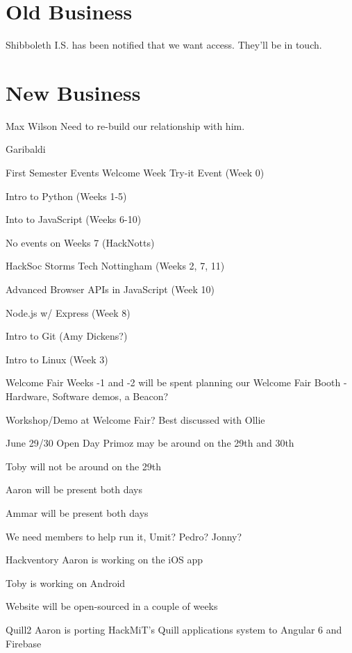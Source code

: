 \documentclass[11pt,hacksoc]{meetingmins}
\begin{document}
\section{Old Business}
\begin{items}
	\item
	Shibboleth
		\subitem
		I.S. has been notified that we want access. They'll be in touch.
\end{items}

\section{New Business}
\begin{items}
	\item
	Max Wilson
		\subitem
		Need to re-build our relationship with him.
	
	\item
	Garibaldi
	
	\item
	First Semester Events
		\subitem
		Welcome Week Try-it Event (Week 0)
		
		\subitem
		Intro to Python (Weeks 1-5)
		
		\subitem
		Into to JavaScript (Weeks 6-10)
		
		\subitem
		No events on Weeks 7 (HackNotts)
		
		\subitem
		HackSoc Storms Tech Nottingham (Weeks 2, 7, 11)
		
		\subitem
		Advanced Browser APIs in JavaScript (Week 10)
		
		\subitem
		Node.js w/ Express (Week 8)
		
		\subitem
		Intro to Git (Amy Dickens?)
		
		\subitem
		Intro to Linux (Week 3)
	
	\item
	Welcome Fair
		\subitem
		Weeks -1 and -2 will be spent planning our Welcome Fair Booth - Hardware, Software demos, a Beacon?
		
		\subitem
		Workshop/Demo at Welcome Fair? Best discussed with Ollie
	
	\item
	June 29/30 Open Day
		\subitem
		Primoz may be around on the 29th and 30th
		
		\subitem
		Toby will not be around on the 29th
		
		\subitem
		Aaron will be present both days
		
		\subitem
		Ammar will be present both days
		
		\subitem
		We need members to help run it, Umit? Pedro? Jonny?
	
	\item
	Hackventory
		\subitem
		Aaron is working on the iOS app
		
		\subitem
		Toby is working on Android
		
		\subitem
		Website will be open-sourced in a couple of weeks
	
	\item
	Quill2
		\subitem
		Aaron is porting HackMiT's Quill applications system to Angular 6 and Firebase
	
\end{items}

\vspace{1em}
\end{document}
